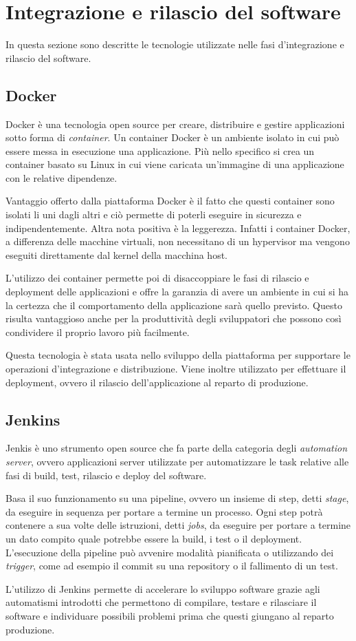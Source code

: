 \section{Integrazione e rilascio del software}
In questa sezione sono descritte le tecnologie utilizzate nelle fasi d'integrazione e rilascio del software.

\subsection{Docker}
Docker \cite{Docker} è una tecnologia open source per creare, distribuire e gestire applicazioni sotto forma di \textit{container}.
Un container Docker è un ambiente isolato in cui può essere messa in esecuzione una applicazione.
Più nello specifico si crea un container basato su Linux in cui viene caricata un'immagine di una applicazione con le relative dipendenze.

Vantaggio offerto dalla piattaforma Docker è il fatto che questi container sono isolati li uni dagli altri
e ciò permette di poterli eseguire in sicurezza e indipendentemente.
Altra nota positiva è la leggerezza. Infatti i container Docker, a differenza delle macchine virtuali, non necessitano
di un hypervisor ma vengono eseguiti direttamente dal kernel della macchina host.

L'utilizzo dei container permette poi di disaccoppiare le fasi di rilascio e deployment delle applicazioni e offre la garanzia
di avere un ambiente in cui si ha la certezza che il comportamento della applicazione sarà quello previsto. Questo risulta
vantaggioso anche per la produttività degli sviluppatori che possono così condividere
il proprio lavoro più facilmente.

Questa tecnologia è stata usata nello sviluppo della piattaforma per supportare le operazioni d'integrazione e distribuzione.
Viene inoltre utilizzato per effettuare il deployment, ovvero il rilascio dell'applicazione al reparto di produzione.

\subsection{Jenkins}
Jenkis \cite{Jenkins} è uno strumento open source che fa parte della categoria degli \textit{automation server}, ovvero applicazioni server utilizzate
per automatizzare le task relative alle fasi di build, test, rilascio e deploy del software.

Basa il suo funzionamento su una pipeline, ovvero un insieme di step, detti \textit{stage}, da eseguire in sequenza per portare a termine un processo.
Ogni step potrà contenere a sua volte delle istruzioni, detti \textit{jobs}, da eseguire per portare a termine un dato compito quale potrebbe essere la build, i test o il deployment.
L'esecuzione della pipeline può avvenire modalità pianificata o utilizzando dei \textit{trigger}, come ad esempio il commit su una repository o il fallimento di un test.

L'utilizzo di Jenkins permette di accelerare lo sviluppo software grazie agli automatismi introdotti che permettono di compilare, testare e rilasciare il software e individuare
possibili problemi prima che questi giungano al reparto produzione.